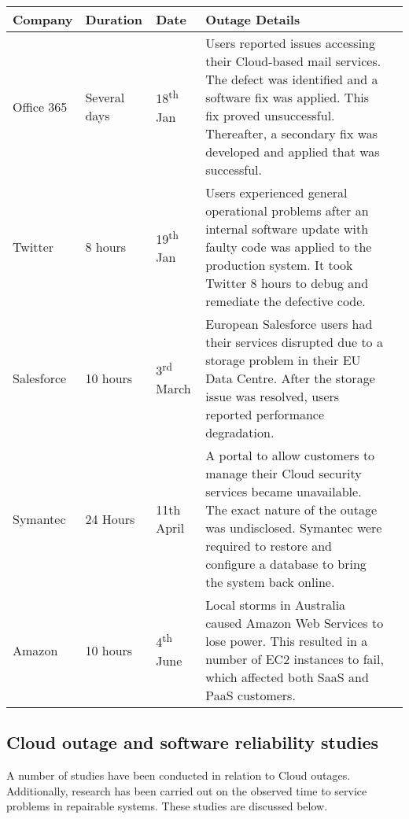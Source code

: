 \documentclass[5p]{elsarticle}
\begin{document}
\begin {table*}[]
\caption {Summary of high-profile Cloud outages in the first half of 2016} 
\begin{flushleft}

\begin{tabular}{l | l | l | p{11.4cm} l} \bf {Company} & \bf {Duration} & \bf {Date} & \bf {Outage Details}  
\\ \hline Office 365 & Several days &  18\textsuperscript{th} Jan & Users reported issues accessing their Cloud-based mail services. The defect was identified and a software fix was applied. This fix proved unsuccessful. Thereafter, a secondary fix was developed and applied that was successful.
\\ \hline Twitter & 8 hours  & 19\textsuperscript{th} Jan & Users experienced general operational problems after an internal software update with faulty code was applied to the production system. It took Twitter 8 hours to debug and remediate the defective code.
\\  \hline Salesforce & 10 hours  &  3\textsuperscript{rd} March &  European Salesforce users had their services disrupted due to a storage problem in their EU Data Centre. After the storage issue was resolved, users reported performance degradation.
\\  \hline Symantec & 24 Hours  &  11th April &  A portal to allow customers to manage their Cloud  security services became unavailable. The exact nature of the outage was undisclosed. Symantec were required to restore and configure a database to bring the system back online.
\\ \hline Amazon & 10 hours  & 4\textsuperscript{th} June & Local storms in Australia caused Amazon Web Services to lose power. This resulted in a number of EC2 instances to fail, which affected both SaaS and PaaS customers. 
\\ \hline 

 \end{tabular}
\end{flushleft}
\end{table*}

\subsection{Cloud outage and software reliability studies}
A number of studies have been conducted in relation to Cloud outages. Additionally, research has been carried out on the observed time to service problems in repairable systems.  These studies are discussed below. \par
\end{document}
